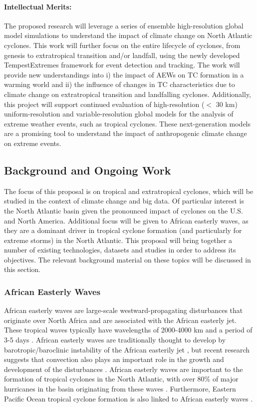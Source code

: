 \documentclass[11pt]{article}
\begin{document}
\paragraph{Intellectual Merits:}  

The proposed research will leverage a series of ensemble high-resolution global model simulations to understand the impact of climate change on North Atlantic cyclones. This work will further focus on the entire lifecycle of cyclones, from genesis to extratropical transition and/or landfall, using the newly developed TempestExtremes framework for event detection and tracking.  The work will provide new understandings into i) the impact of AEWs on TC formation in a warming world and ii) the influence of changes in TC characteristics due to climate change on extratropical transition and landfalling cyclones. Additionally, this project will support continued evaluation of high-resolution ($<$ 30 km) uniform-resolution and variable-resolution global models for the analysis of extreme weather events, such as tropical cyclones. These next-generation models are a promising tool to understand the impact of anthropogenic climate change on extreme events.  

\subsection{Background and Ongoing Work} \label{sec:BackgroundOngoingWork}

The focus of this proposal is on tropical and extratropical cyclones, which will be studied in the context of climate change and big data.  Of particular interest is the North Atlantic basin given the pronounced impact of cyclones on the U.S. and North America. Additional focus will be given to African easterly waves, as they are a dominant driver in tropical cyclone formation (and particularly for extreme storms) in the North Atlantic. This proposal will bring together a number of existing technologies, datasets and studies in order to address its objectives.  The relevant background material on these topics will be discussed in this section.

\subsubsection{African Easterly Waves}
African easterly waves are large-scale westward-propagating disturbances that originate over North Africa and are associated with the African easterly jet. These tropical waves typically have wavelengths of 2000-4000 km and a period of 3-5 days \citep{Burpee1974,Reed1977}. African easterly waves are traditionally thought to develop by barotropic/baroclinic instability of the African easterily jet \citep{Burpee1972}, but recent research suggests that convection also plays an important role in the growth and development of the disturbances \citep{Hall2006,Thorncroft2008,Hsieh&Cook2005,Berry&Thorncroft2012}. African easterly waves are important to the formation of tropical cyclones in the North Atlantic, with over 80$\%$ of major hurricanes in the basin originating from these waves \citep{Landsea1993}. Furthermore, Eastern Pacific Ocean tropical cyclone formation is also linked to African easterly waves \citep{Avila&Pasch1995}. 
\end{document}
